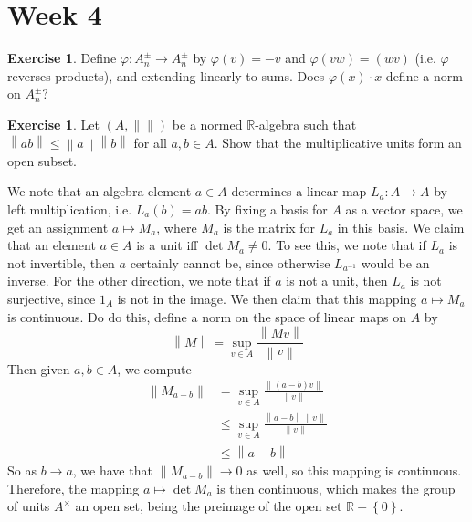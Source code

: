 \documentclass[psamsfonts]{amsart}
\theoremstyle{definition}
\newtheorem{exer}[thm]{Exercise}
\theoremstyle{remark}
\newcommand{\R}{\mathbb{R}}
\newcommand{\inv}{^{-1}}
\newcommand{\set}[1]{\left\lbrace #1 \right\rbrace}
\newcommand{\norm}[1]{\left\lVert#1\right\rVert}
\begin{document}
\section*{Week 4}
%
\begin{exer}
Define $\varphi : A^\pm_n \to A^\pm_n$ by $\varphi(v) = -v$ and $\varphi(vw) = (wv)$ (i.e. $\varphi$ reverses products), and extending linearly to sums. Does $\varphi(x)\cdot x$ define a norm on $A^\pm_n$?
\end{exer}
%
\begin{exer}
Let $(A, \norm{})$ be a normed $\R$-algebra such that $\norm{ab} \leq \norm{a}\norm{b}$ for all $a,b \in A$. Show that the multiplicative units form an open subset.
\end{exer}
We note that an algebra element $a \in A$ determines a linear map $L_a : A \to A$ by left multiplication, i.e. $L_a(b) = ab$. By fixing a basis for $A$ as a vector space, we get an assignment $a \mapsto M_a$, where $M_a$ is the matrix for $L_a$ in this basis. We claim that an element $a \in A$ is a unit iff $\det M_a \neq 0$. To see this, we note that if $L_a$ is not invertible, then $a$ certainly cannot be, since otherwise $L_{a\inv}$ would be an inverse. For the other direction, we note that if $a$ is not a unit, then $L_a$ is not surjective, since $1_A$ is not in the image. We then claim that this mapping $a \mapsto M_a$ is continuous. Do do this, define a norm on the space of linear maps on $A$ by
$$\norm{M} = \sup_{v \in A} \frac{\norm{Mv}}{\norm{v}} $$
Then given $a,b \in A$, we compute
\begin{align*}
\norm{M_{a-b}} &= \sup_{v \in A} \frac{\norm{(a-b)v}}{\norm{v}} \\
&\leq \sup_{v \in A} \frac{\norm{a-b}\norm{v}}{\norm{v}} \\
&\leq \norm{a-b}
\end{align*}
So as $b \to a$, we have that $\norm{M_{a-b}} \to 0$ as well, so this mapping is continuous. Therefore, the mapping $a \mapsto \det M_a$ is then continuous, which makes the group of units $A^\times$ an open set, being the preimage of the open set $\R - \set{0}$.
\end{document}
